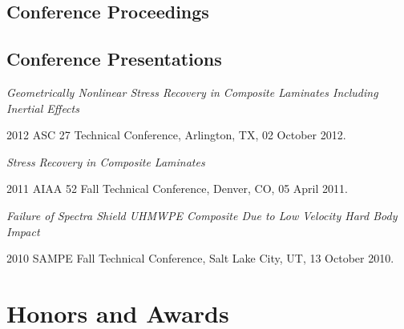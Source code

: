 \documentclass[10pt,letterpaper]{article}
\renewenvironment{itemize}{
  \begin{list}{}{
    \setlength{\leftmargin}{30pt}
    \setlength{\itemsep}{0.2em}
    \setlength{\parskip}{0pt}
    \setlength{\parsep}{0.25em}
  }
}{
  \end{list}
}
\renewcommand{\textsuperscript}[1]{%
  \raisebox{2.5pt}{\scriptsize \hspace{0.3pt}#1}%
}
\begin{document}
\begin{biblist}
\item {}
\end{biblist}

\subsection*{Conference Proceedings}
\begin{biblist}
\item {}
\item {}
\item {}
\item {}
\end{biblist}

\subsection*{Conference Presentations}
\begin{itemize}
\item \textit{Geometrically Nonlinear Stress Recovery in Composite Laminates
    Including Inertial Effects}
  \begin{itemize}
  \item 2012 ASC 27\textsuperscript{nd} Technical Conference, Arlington, TX,
    02 October 2012.
  \end{itemize}
\item \textit{Stress Recovery in Composite Laminates}
  \begin{itemize}
  \item 2011 AIAA 52\textsuperscript{nd} Fall Technical Conference,
    Denver, CO,
    05 April 2011.
  \end{itemize}
\item \textit{Failure of Spectra Shield UHMWPE Composite Due to Low Velocity
    Hard Body Impact}
  \begin{itemize}
  \item 2010 SAMPE Fall Technical Conference,
    Salt Lake City, UT,
    13 October 2010.
  \end{itemize}
\end{itemize}

\section*{Honors and Awards}
\end{document}
